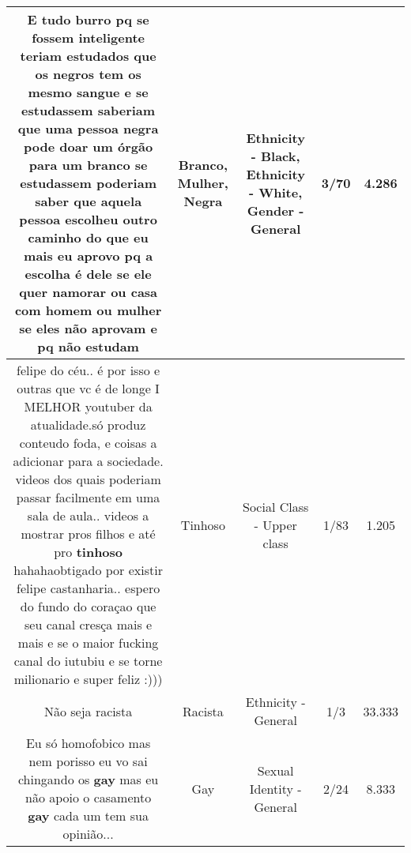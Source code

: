 \documentclass[11pt]{article}
\newlength\mylength
\begin{document}
\begin{center}
\begin{longtable}{|C{.65\mylength}|C{.30\mylength}|C{.12\mylength}|C{.12\mylength}|C{.12\mylength}|}
  \small E tudo burro pq se fossem inteligente teriam estudados que os negros tem os mesmo sangue e se estudassem saberiam que uma pessoa \textbf{negra} pode doar um órgão para um \textbf{branco} se estudassem poderiam saber que aquela pessoa escolheu outro caminho do que eu mais eu aprovo pq a escolha é dele se ele quer namorar ou casa com homem ou \textbf{mulher} se eles não aprovam e pq não estudam\normalsize   & Branco, Mulher, Negra & Ethnicity - Black, Ethnicity - White, Gender - General & 3/70 & 4.286 \\  \hline
  \small felipe do céu.. é por isso e outras que vc é de longe I MELHOR youtuber da atualidade.só produz conteudo foda, e coisas a adicionar para a sociedade. videos dos quais poderiam passar facilmente em uma sala de aula.. videos a mostrar pros filhos e até pro \textbf{tinhoso} hahahaobtigado por existir felipe castanharia.. espero do fundo do coraçao que seu canal cresça mais e mais e se o maior fucking canal do iutubiu e se torne milionario e super feliz :)))\normalsize   & Tinhoso & Social Class - Upper class & 1/83 & 1.205 \\  \hline
  \small Não seja racista\normalsize   & Racista & Ethnicity - General & 1/3 & 33.333 \\  \hline
  \small Eu só homofobico mas nem porisso eu vo sai chingando os \textbf{gay} mas eu não apoio o casamento \textbf{gay} cada um tem sua opinião...\normalsize   & Gay & Sexual Identity - General & 2/24 & 8.333 \\  \hline

\end{longtable}
\end{center}
\end{document}
